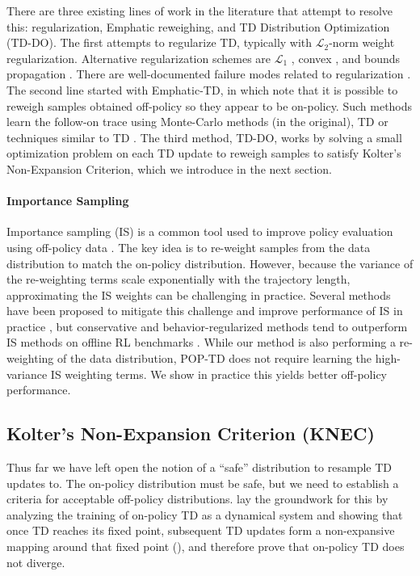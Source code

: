 There are three existing lines of work in the literature that attempt to resolve this: regularization, Emphatic reweighing, and TD Distribution Optimization (TD-DO).
The first attempts to regularize TD, typically with $\mathcal L_2$-norm weight regularization. Alternative regularization schemes are $\mathcal L_1$ \citep{mahadevan2014proximal}, convex \citep{yu2017convergence}, and bounds propagation \citep{kumar2020discor}. There are well-documented failure modes related to regularization \cite{manek2022pitfalls}.
The second line started with Emphatic-TD, in which \citet{sutton2016emphatic} note that it is possible to reweigh samples obtained off-policy so they appear to be on-policy. Such methods learn the follow-on trace using Monte-Carlo methods (in the original), TD \citep{jiang2021learning,zhang2020provably} or techniques similar to TD \citep{hasselt2021expected}. The third method, TD-DO, works by solving a small optimization problem on each TD update to reweigh samples to satisfy Kolter's Non-Expansion Criterion, which we introduce in the next section.

\paragraph{Importance Sampling}
Importance sampling (IS) is a common tool used to improve policy evaluation using off-policy data \citep{precup2000eligibility}.
The key idea is to re-weight samples from the data distribution to match the on-policy distribution.
However, because the variance of the re-weighting terms scale exponentially with the trajectory length, approximating the IS weights can be challenging in practice.
Several methods have been proposed to mitigate this challenge and improve performance of IS in practice \citep{hallak2017consistent, gelada2019off, nachum2019dualdice, nachum2019algaedice, liu2018breaking}, but conservative and behavior-regularized methods tend to outperform IS methods on offline RL benchmarks \citep{fu2020d4rl}.
While our method is also performing a re-weighting of the data distribution, POP-TD does not require learning the high-variance IS weighting terms.
We show in practice this yields better off-policy performance.


\subsection{Kolter's Non-Expansion Criterion (KNEC)}
Thus far we have left open the notion of a ``safe'' distribution to resample TD updates to. The on-policy distribution must be safe, but we need to establish a criteria for acceptable off-policy distributions. \citeauthor{tsitsiklis1996analysis} lay the groundwork for this by analyzing the training of on-policy TD as a dynamical system and showing that once TD reaches its fixed point, subsequent TD updates form a non-expansive mapping around that fixed point (\citeyear[lemma 4]{tsitsiklis1996analysis}), and therefore prove that on-policy TD does not diverge.


